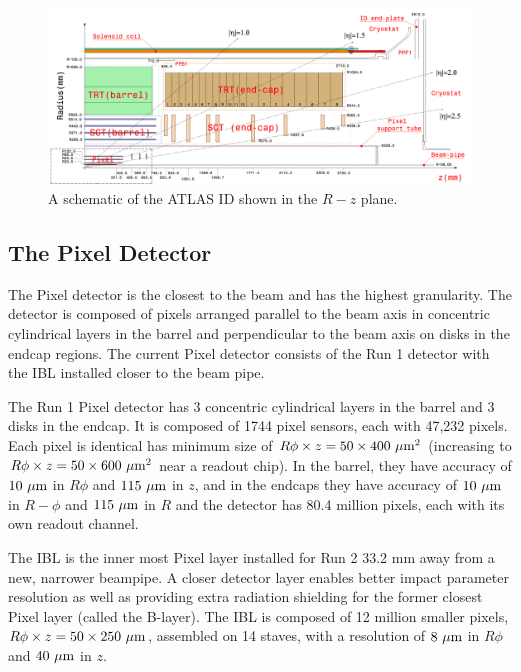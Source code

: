 \begin{figure}[htbp]
\centering
\includegraphics[width=.8\textwidth]{figures/Detector/atlas-id-layers.png}
\caption{A schematic of the \ac{ATLAS} \ac{ID} shown in the $R-z$ plane. \cite{id-cutaway}}
\label{fig:atlas-id-layers}
\end{figure}


\subsection{The Pixel Detector}

The Pixel detector is the closest to the beam and has the highest granularity. The detector is composed of pixels arranged parallel to the beam axis in concentric cylindrical layers in the barrel and perpendicular to the beam axis on disks in the endcap regions. The current Pixel detector consists of the Run 1 detector with the \ac{IBL} installed closer to the beam pipe. 

The Run 1 Pixel detector has 3 concentric cylindrical layers in the barrel and 3 disks in the endcap. It is composed of 1744 pixel sensors, each with 47,232 pixels. Each pixel is identical has minimum size of $R\phi \times z = 50 \times 400~\mu\text{m}^{2}$ (increasing to $R\phi \times z = 50 \times 600~\mu\text{m}^{2}$ near a readout chip). In the barrel, they have accuracy of $10~\mu\text{m}$ in $R\phi$ and $115~\mu\text{m}$ in $z$, and in the endcaps they have accuracy of $10~\mu\text{m}$ in $R-\phi$ and $115~\mu\text{m}$ in $R$ and the detector has 80.4 million pixels, each with its own readout channel. 

The \ac{IBL} is the inner most Pixel layer installed for Run 2 33.2 mm away from a new, narrower beampipe. A closer detector layer enables better impact parameter resolution as well as providing extra radiation shielding for the former closest Pixel layer (called the B-layer). The \ac{IBL} is composed of 12 million smaller pixels, $R\phi \times z = 50 \times 250~\mu\text{m}$, assembled on 14 staves, with a resolution of $8~\mu\text{m}$ in $R\phi$ and $40~\mu\text{m}$ in $z$.

